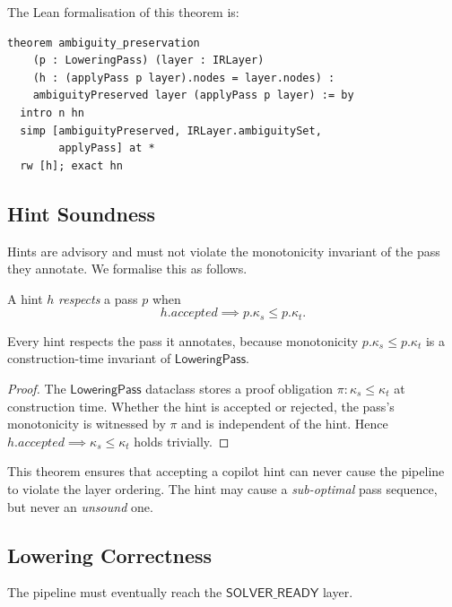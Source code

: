 \documentclass[11pt]{article}
\newcommand{\LP}{\mathsf{LoweringPass}}
\newcommand{\SolverReady}{\mathsf{SOLVER\_READY}}
\begin{document}
The Lean formalisation of this theorem is:
\begin{lstlisting}[language=lean, basicstyle=\ttfamily\small,
  caption={Lean proof of ambiguity preservation.}]
theorem ambiguity_preservation
    (p : LoweringPass) (layer : IRLayer)
    (h : (applyPass p layer).nodes = layer.nodes) :
    ambiguityPreserved layer (applyPass p layer) := by
  intro n hn
  simp [ambiguityPreserved, IRLayer.ambiguitySet,
        applyPass] at *
  rw [h]; exact hn
\end{lstlisting}

\subsection{Hint Soundness}\label{sec:hint-sound}

Hints are advisory and must not violate the monotonicity invariant of
the pass they annotate.  We formalise this as follows.

\begin{definition}\label{def:hint-respect}
A hint $h$ \emph{respects} a pass $p$ when
\[
  h.\mathit{accepted} \implies p.\kappa_s \le p.\kappa_t.
\]
\end{definition}

\begin{theorem}\label{thm:hint-sound}
Every hint respects the pass it annotates, because monotonicity
$p.\kappa_s \le p.\kappa_t$ is a construction-time invariant of
$\LP$.
\end{theorem}

\begin{proof}
The $\LP$ dataclass stores a proof obligation $\pi : \kappa_s \le
\kappa_t$ at construction time.  Whether the hint is accepted or
rejected, the pass's monotonicity is witnessed by $\pi$ and is
independent of the hint.  Hence $h.\mathit{accepted} \implies \kappa_s
\le \kappa_t$ holds trivially.
\end{proof}

This theorem ensures that accepting a copilot hint can never cause the
pipeline to violate the layer ordering.  The hint may cause a
\emph{sub-optimal} pass sequence, but never an \emph{unsound} one.

\subsection{Lowering Correctness}\label{sec:lower-correct}

The pipeline must eventually reach the $\SolverReady$ layer.
\end{document}
